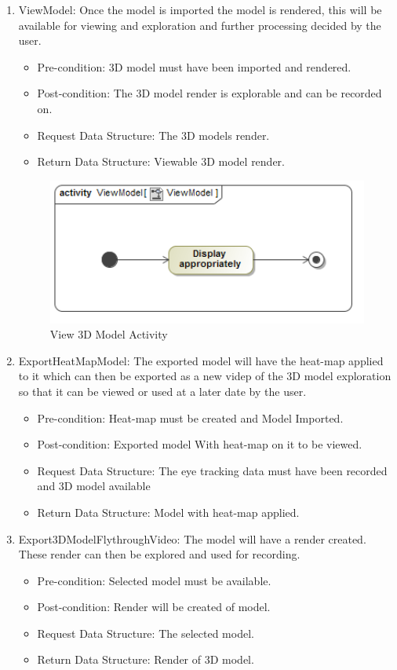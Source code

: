 \begin{enumerate}
		\item{ViewModel:}
		Once the model is imported the model is rendered, this will be available for viewing and exploration and further processing decided by the user.
		\begin{itemize}
			\item Pre-condition: 3D model must have been imported and rendered.
			\item Post-condition: The 3D model render is explorable and can be recorded on.
			\item Request Data Structure: The 3D models render.
			\item Return Data Structure: Viewable 3D model render.
		\end{itemize}
		\begin{figure}[!ht]
			\centering
			\includegraphics[scale=0.5,width=15cm,keepaspectratio]{Diagrams/Activity_Diagram__ViewModel__ViewModel.png}
		\caption{View 3D Model Activity}
		\end{figure}
		
		\item{ExportHeatMapModel:}
		The exported model will have the heat-map applied to it which can then be exported as a new videp of the 3D model exploration so that it can be viewed or used at a later date by the user. 
		\begin{itemize}
			\item Pre-condition: Heat-map must be created and Model Imported.
			\item Post-condition: Exported model With heat-map on it to be viewed.
			\item Request Data Structure: The eye tracking data must have been recorded and 3D model available
			\item Return Data Structure: Model with heat-map applied.
		\end{itemize}
		
		\item{Export3DModelFlythroughVideo:}
		The model will have a render created. These render can then be explored and used for recording.
		\begin{itemize}
			\item Pre-condition: Selected model must be available.
			\item Post-condition: Render will be created of model.
			\item Request Data Structure: The selected model.
			\item Return Data Structure: Render of 3D model.
		\end{itemize}
		

\end{enumerate}
